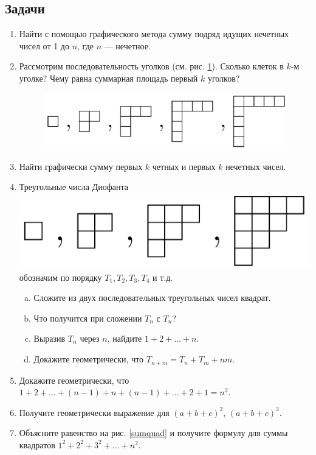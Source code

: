 \subsection*{Задачи}
\begin{enumerate}
\item Найти с помощью графического метода сумму подряд идущих нечетных чисел от 1 до $n$, где $n$ --- нечетное.
\item Рассмотрим последовательность уголков (см. рис. \ref{ugolki}). Сколько клеток в $k$-м уголке? Чему равна суммарная площадь первый $k$ уголков?
\begin{figure}[hbt!]
\begin{center}
 \includegraphics[scale=0.3]{../ugolki.png}
\end{center}
\caption{}\label{ugolki}
\end{figure}
\item Найти графически сумму первых $k$ четных и первых $k$ нечетных чисел.
\item Треугольные числа Диофанта  \includegraphics[scale=0.1]{../triangle.png} обозначим по порядку $T_1,T_2,T_3,T_4$ и т.д.
\begin{enumerate}[a)]
\item Сложите из двух последовательных треугольных чисел квадрат.
\item Что получится при сложении $T_n$ с $T_n$?
\item Выразив $T_n$ через $n$, найдите $1+2+\dots+n$.
\item Докажите геометрически, что $T_{n+m}=T_n+T_m+nm$.
\end{enumerate}
\item Докажите геометрически, что $1+2+\dots+(n-1)+n+(n-1)+\dots+2+1=n^2$.
\item Получите геометрически выражение для $(a+b+c)^2$, $(a+b+c)^3$.
\item Объясните равенство на рис. \ref{sumquad} и получите формулу для суммы квадратов $1^2+2^2+3^2+\dots+n^2$.

\end{enumerate}
